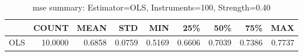 \begin{table}[ht]
\centering
\caption{mse summary: Estimator=OLS, Instruments=100, Strength=0.40}
\begin{tabular}{lrrrrrrrr}
\toprule
 & COUNT & MEAN & STD & MIN & 25\% & 50\% & 75\% & MAX \\
\midrule
OLS & 10.0000 & 0.6858 & 0.0759 & 0.5169 & 0.6606 & 0.7039 & 0.7386 & 0.7737 \\
\bottomrule
\end{tabular}
\end{table}
